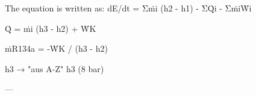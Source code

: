 The equation is written as:  
dE/dt = Σṁi (h2 - h1) - ΣQ̇i - ΣṁiẆi  

Q̇ = ṁi (h3 - h2) + ẆK  

ṁR134a = -ẆK / (h3 - h2)  

h3 → "aus A-Z"  
h3 (8 bar)  

---